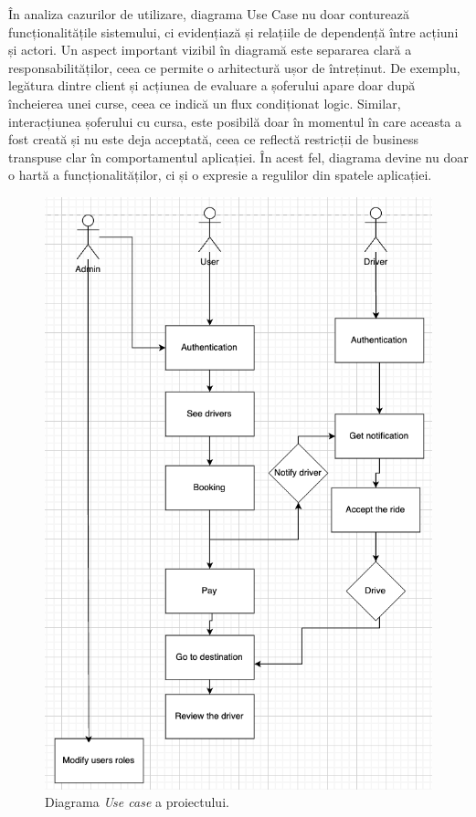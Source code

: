 În analiza cazurilor de utilizare, diagrama Use Case nu doar conturează 
funcționalitățile sistemului, ci evidențiază și relațiile de dependență între acțiuni 
și actori. Un aspect important vizibil în diagramă este separarea clară a 
responsabilităților, ceea ce permite o arhitectură ușor de întreținut. 
De exemplu, legătura dintre client și acțiunea de evaluare a șoferului apare doar 
după încheierea unei curse, ceea ce indică un flux condiționat logic. Similar, 
interacțiunea șoferului cu cursa, este posibilă doar în momentul în care aceasta a 
fost creată și nu este deja acceptată, ceea ce reflectă restricții de business 
transpuse clar în comportamentul aplicației. În acest fel, diagrama devine nu doar o 
hartă a funcționalităților, ci și o expresie a regulilor din spatele aplicației.

\begin{figure}[H]
    \centering
    \includegraphics[width=15cm]{Assets/UserCase.png}
    \caption{Diagrama \textit{Use case} a proiectului.}
    \label{fig:UserCase}
\end{figure}

